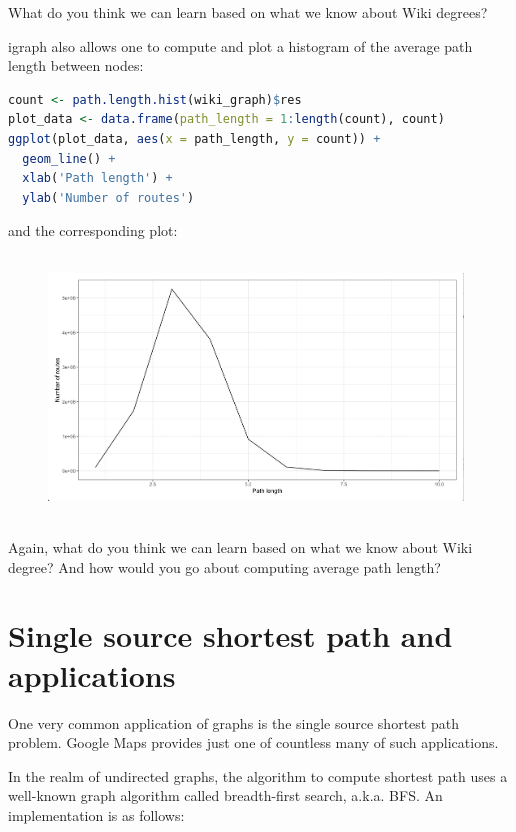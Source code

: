 What do you think we can learn based on what we know about Wiki degrees?

igraph also allows one to compute and plot a histogram of the average path length between nodes:

\begin{lstlisting}[language=R]
count <- path.length.hist(wiki_graph)$res
plot_data <- data.frame(path_length = 1:length(count), count)
ggplot(plot_data, aes(x = path_length, y = count)) +
  geom_line() +
  xlab('Path length') +
  ylab('Number of routes')
\end{lstlisting}

and the corresponding plot:

\begin{figure}[h]
\includegraphics[width=11cm, height=7cm]{figures/path_len.png}
\centering
\end{figure}

Again, what do you think we can learn based on what we know about Wiki degree? And how would you go about computing average path length?

\section{Single source shortest path and applications}

One very common application of graphs is the single source shortest path problem. Google Maps provides just one of countless many of such applications.

In the realm of undirected graphs, the algorithm to compute shortest path uses a well-known graph algorithm called breadth-first search, a.k.a. BFS. An implementation is as follows:

